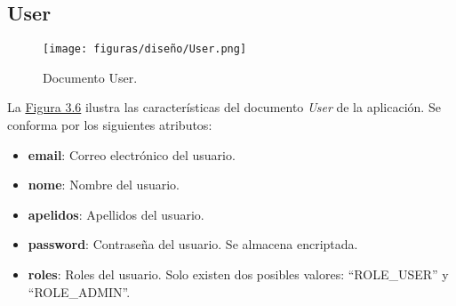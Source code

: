 \subsection{User}

\begin{figure}[H]
\centerline{\texttt{[image: figuras/diseño/User.png]}}
\caption{Documento User.}
\label{enlaceUser}
\end{figure}

La \hyperref[enlaceUser]{Figura 3.6} ilustra las características del documento {\it User} de la aplicación. Se conforma por los siguientes atributos:

\begin{itemize}
    \item {\bf email}: Correo electrónico del usuario.
    \item {\bf nome}: Nombre del usuario.
    \item {\bf apelidos}: Apellidos del usuario.
    \item {\bf password}: Contraseña del usuario. Se almacena encriptada.
    \item {\bf roles}: Roles del usuario. Solo existen dos posibles valores: ``ROLE\_USER'' y ``ROLE\_ADMIN''.
\end{itemize}